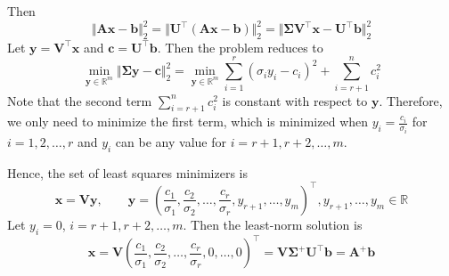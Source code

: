 \documentclass[11pt,letter,notitlepage]{article}
\theoremstyle{definition}
\begin{document}
\begin{solution}
\begin{enumerate}
	Then
	\[
	\Vert \mathbf{A} \mathbf{x} - \mathbf{b} \Vert_2^2
	=
	\Vert \mathbf{U^{\top}} (\mathbf{Ax} - \mathbf{b}) \Vert_2^2
	=
	\Vert \boldsymbol{\Sigma} \mathbf{V}^{\top} \mathbf{x} - \mathbf{U}^{\top} \mathbf{b} \Vert_2^2
	\]
	Let $\mathbf{y} = \mathbf{V}^{\top} \mathbf{x}$ and $\mathbf{c} = \mathbf{U}^{\top} \mathbf{b}$. Then the problem reduces to
	\[
	\min_{\mathbf{y} \in \mathbb{R}^m} \Vert \boldsymbol{\Sigma} \mathbf{y} - \mathbf{c} \Vert_2^2
	=
	\min_{\mathbf{y} \in \mathbb{R}^m} \sum\limits_{i=1}^{r} (\sigma_i y_i - c_i)^2 + \sum\limits_{i=r+1}^{n} c_i^2
	\]
	Note that the second term $\sum\limits_{i=r+1}^{n} c_i^2$ is constant with respect to $\mathbf{y}$. Therefore, we only need to minimize the first term, which is minimized when $y_i = \frac{c_i}{\sigma_i}$ for $i = 1, 2, \ldots, r$ and $y_i$ can be any value for $i = r+1, r+2, \ldots, m$.

	Hence, the set of least squares minimizers is
	\[
	\mathbf{x}
	=
	\mathbf{V} \mathbf{y},
	\qquad
	\mathbf{y}
	=
	(\frac{c_1}{\sigma_1}, \frac{c_2}{\sigma_2}, \ldots, \frac{c_r}{\sigma_r}, y_{r+1}, \ldots, y_m)^{\top},
	y_{r+1}, \ldots, y_m \in \mathbb{R}
	\]
	Let $y_i = 0$, $i = r+1, r+2, \ldots, m$. Then the least-norm solution is
	\[
	\mathbf{x}
	=
	\mathbf{V}
	(\frac{c_1}{\sigma_1}, \frac{c_2}{\sigma_2}, \ldots, \frac{c_r}{\sigma_r}, 0, \ldots, 0)^{\top}
	=
	\mathbf{V} \boldsymbol{\Sigma}^{+} \mathbf{U}^{\top} \mathbf{b}
	=
	\mathbf{A}^{+} \mathbf{b}
	\]
	\end{enumerate}
\end{solution}

	
	\newpage
	\newpage
    
    
	
\end{document}

